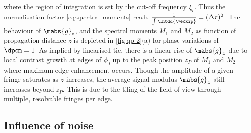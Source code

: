 \documentclass[
twoside,
openright,
titlepage,
numbers=noenddot,
headinclude,
fleqn,
a4paper,
footinclude=true,
cleardoublepage=empty,
abstractoff,
BCOR=5mm,
paper=a4,
fontsize=11pt,
british,ngerman,american,
]{scrreprt}
\begin{document}
where the region of integration is set by the cut-off frequency
$\xi_c$.  Thus the normalisation factor \cref{eq:spectral-moments}
reads $\frac{1}{\int\Intdd{\vecxip}}=(\Delta x)^2$.  The behaviour of
$\mabs{g}_z$, and the spectral moments $M_1$ and $M_2$ as function of
propagation distance $z$ is depicted in \cref{fig:qp-2}(a) for phase
variations of $\dpom=1$.  As implied by linearised \ac{tie}, there is
a linear rise of $\mabs{g}_z$ due to local contrast growth at edges of
$\phi_0$ up to the peak position $z_P$ of $M_1$ and $M_2$ where
maximum edge enhancement occurs.  Though the amplitude of a given
fringe saturates as $z$ increases, the average signal modulus
$\mabs{g}_z$ still increases beyond $z_P$.  This is due to the tiling
of the field of view through multiple, resolvable fringes per edge.

\subsection{Influence of noise}
\label{sec:qp-noise}
\end{document}
